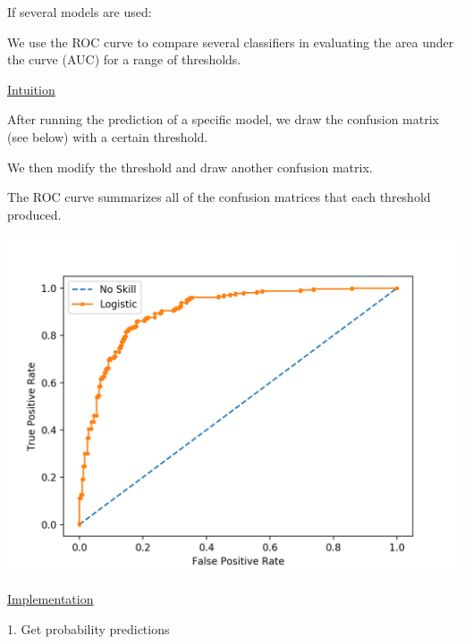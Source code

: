 \vspace{5mm}

If several models are used:

We use the ROC curve to compare several classifiers in evaluating the area under the curve (AUC) for a range of thresholds.

\vspace{5mm}

\underline{Intuition}

\vspace{5mm}

After running the prediction of a specific model, we draw the confusion matrix (see below) with a certain threshold.

\vspace{5mm}

We then modify the threshold and draw another confusion matrix.

The ROC curve summarizes all of the confusion matrices that each threshold produced.

\vspace{5mm}

\begin{center}
\includegraphics[scale=0.5]{ROC.png}
\end{center}

\vspace{5mm}

\underline{Implementation}

\vspace{5mm}

1. Get probability predictions

